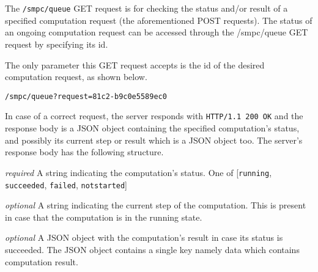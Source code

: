 \section[/smpc/queue GET request]{\protect{}}\label{s:get1}
The \texttt{/smpc/queue} GET request is for checking the status and/or result of a specified computation request (the aforementioned POST requests).
The status of an ongoing computation request can be accessed through the /smpc/queue GET request by specifying its id.
\begin{description}[labelwidth=5em, leftmargin=\dimexpr\labelwidth+\labelsep\relax]
  \item[Request:] The only parameter this GET request accepts is the id of the desired computation request, as shown below.

\begin{minipage}{\linewidth}
{
\begin{verbatim}
/smpc/queue?request=81c2-b9c0e5589ec0
\end{verbatim}
\label{sc:queue-request}
}
\end{minipage}
  \item[Response:] In case of a correct request, the server responds with \texttt{HTTP/1.1 200 OK} and the response body is a JSON object containing the specified computation's status, and possibly its current step or result which is a JSON object too.
The server's response body has the following structure.
\begin{description}[labelwidth=4em, leftmargin=\dimexpr\labelwidth+\labelsep\relax]
    \item [\texttt{status}:]{\color{red}\textit{required}} A string indicating the computation's status. One of [\texttt{running}, \texttt{succeeded}, \texttt{failed}, \texttt{notstarted}]
    \item [\texttt{step}:]{\color{blue}\textit{optional}} A string indicating the current step of the computation. This is present in case that the computation is in the running state.
    \item [\texttt{result}:]{\color{blue}\textit{optional}} A JSON object with the computation's result in case its status is succeeded. The JSON object contains a single key namely data which contains computation result.


\end{description}
\end{description}
